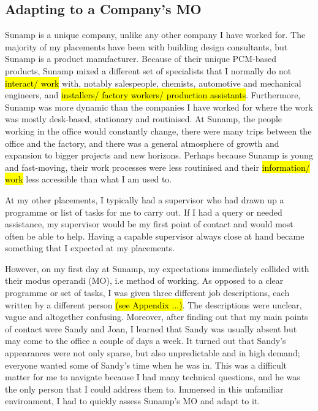 
\subsection{Adapting to a Company's MO}

Sunamp is a unique company, unlike any other company I have worked for.
The majority of my placements have been with building design consultants, but Sunamp is a product manufacturer.
Because of their unique PCM-based products, Sunamp mixed a different set of specialists that I normally do not \hl{interact/ work} with, notably salespeople, chemists, automotive and mechanical engineers, and \hl{installers/ factory workers/ production assistants}.
Furthermore, Sunamp was more dynamic than the companies I have worked for where the work was mostly desk-based, stationary and routinised.
At Sunamp, the people working in the office would constantly change, there were many trips between the office and the factory, and there was a general atmosphere of growth and expansion to bigger projects and new horizons.
Perhaps because Sunamp is young and fast-moving, their work processes were less routinised and their \hl{information/ work} less accessible than what I am used to.

At my other placements, I typically had a supervisor who had drawn up a programme or list of tasks for me to carry out.
If I had a query or needed assistance, my supervisor would be my first point of contact and would most often be able to help.
Having a capable supervisor always close at hand became something that I expected at my placements.


However, on my first day at Sunamp, my expectations immediately collided with their modus operandi (MO), i.e method of working.
As opposed to a clear programme or set of tasks, I was given three different job descriptions, each written by a different person \hl{(see Appendix ...)}.
The descriptions were unclear, vague and altogether confusing.
Moreover, after finding out that my main points of contact were Sandy and Joan, I learned that Sandy was usually absent but may come to the office a couple of days a week.
It turned out that Sandy's appearances were not only sparse, but also unpredictable and in high demand; everyone wanted some of Sandy's time when he was in.
This was a difficult matter for me to navigate because I had many technical questions, and he was the only person that I could address them to.
Immersed in this unfamiliar environment, I had to quickly assess Sunamp's MO and adapt to it.

